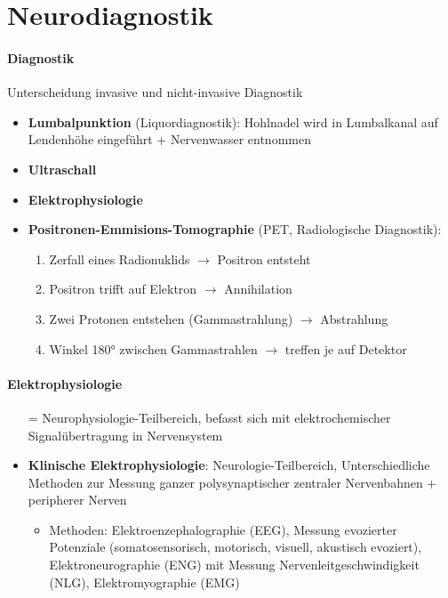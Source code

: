 \section*{Neurodiagnostik}

\paragraph{Diagnostik}
Unterscheidung invasive und nicht-invasive Diagnostik
\begin{itemize}
  \item \textbf{Lumbalpunktion} (Liquordiagnostik): Hohlnadel wird in Lumbalkanal auf Lendenhöhe eingeführt + Nervenwasser entnommen
  \item \textbf{Ultraschall}
  \item \textbf{Elektrophysiologie}
  \item \textbf{Positronen-Emmisions-Tomographie} (PET, Radiologische Diagnostik):
  \begin{enumerate}
    \item Zerfall eines Radionuklids \( \to \) Positron entsteht
    \item Positron trifft auf Elektron \( \to \) Annihilation
    \item Zwei Protonen entstehen (Gammastrahlung) \( \to \) Abstrahlung
    \item Winkel 180° zwischen Gammastrahlen \( \to \) treffen je auf Detektor
  \end{enumerate}
\end{itemize}

\paragraph{Elektrophysiologie}
\begin{itemize}
  \item[=] Neurophysiologie-Teilbereich, befasst sich mit elektrochemischer Signalübertragung in Nervensystem
  \item \textbf{Klinische Elektrophysiologie}: Neurologie-Teilbereich, Unterschiedliche Methoden zur Messung ganzer polysynaptischer zentraler Nervenbahnen + peripherer Nerven
  \begin{itemize}
    \item Methoden: Elektroenzephalographie (EEG), Messung evozierter Potenziale (somatosensorisch, motorisch, visuell, akustisch evoziert), Elektroneurographie (ENG) mit Messung Nervenleitgeschwindigkeit (NLG), Elektromyographie (EMG)
  \end{itemize} 
\end{itemize}

